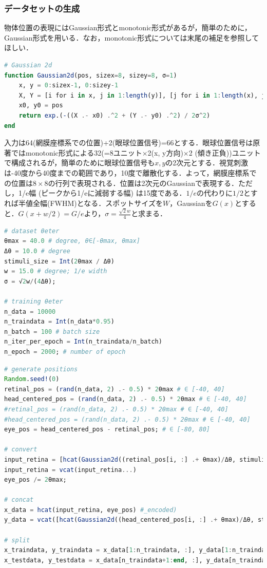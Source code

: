 \subsubsection{データセットの生成}
物体位置の表現にはGaussian形式とmonotonic形式があるが，簡単のために，Gaussian形式を用いる．なお，monotonic形式については末尾の補足を参照してほしい．
\begin{lstlisting}[language=julia]
# Gaussian 2d
function Gaussian2d(pos, sizex=8, sizey=8, σ=1)
    x, y = 0:sizex-1, 0:sizey-1
    X, Y = [i for i in x, j in 1:length(y)], [j for i in 1:length(x), j in y]
    x0, y0 = pos
    return exp.(-((X .- x0) .^2 + (Y .- y0) .^2) / 2σ^2)
end
\end{lstlisting}
入力は64(網膜座標系での位置)+2(眼球位置信号)=66とする．眼球位置信号は原著ではmonotonic形式による32(=8ユニット×2(x, y方向)×2 (傾き正負))ユニットで構成されるが，簡単のために眼球位置信号も$x, y$の2次元とする．視覚刺激は-40度から40度までの範囲であり，10度で離散化する．よって，網膜座標系での位置は$8\times 8$の行列で表現される．位置は2次元のGaussianで表現する．ただし，1/e幅 (ピークから1/eに減弱する幅) は15度である．$1/e$の代わりに$1/2$とすれば半値全幅(FWHM)となる．スポットサイズを$W$，Gaussianを$G(x)$とすると．$G(x+w/2)=G/e$より，$\sigma=\frac{\sqrt{2}w}{4}$と求まる．
\begin{lstlisting}[language=julia]
# dataset θeter
θmax = 40.0 # degree, θ∈[-θmax, θmax]
Δθ = 10.0 # degree
stimuli_size = Int(2θmax / Δθ)
w = 15.0 # degree; 1/e width
σ = √2w/(4Δθ);

# training θeter
n_data = 10000
n_traindata = Int(n_data*0.95)
n_batch = 100 # batch size
n_iter_per_epoch = Int(n_traindata/n_batch)
n_epoch = 2000; # number of epoch
\end{lstlisting}
\begin{lstlisting}[language=julia]
# generate positions
Random.seed!(0)
retinal_pos = (rand(n_data, 2) .- 0.5) * 2θmax # ∈ [-40, 40]
head_centered_pos = (rand(n_data, 2) .- 0.5) * 2θmax # ∈ [-40, 40]
#retinal_pos = (rand(n_data, 2) .- 0.5) * 2θmax # ∈ [-40, 40]
#head_centered_pos = (rand(n_data, 2) .- 0.5) * 2θmax # ∈ [-40, 40]
eye_pos = head_centered_pos - retinal_pos; # ∈ [-80, 80]

# convert
input_retina = [hcat(Gaussian2d((retinal_pos[i, :] .+ θmax)/Δθ, stimuli_size, stimuli_size, σ)...) for i in 1:n_data];
input_retina = vcat(input_retina...)
eye_pos /= 2θmax;

# concat
x_data = hcat(input_retina, eye_pos) #_encoded)
y_data = vcat([hcat(Gaussian2d((head_centered_pos[i, :] .+ θmax)/Δθ, stimuli_size, stimuli_size, σ)...) for i in 1:n_data]...);

# split
x_traindata, y_traindata = x_data[1:n_traindata, :], y_data[1:n_traindata, :]
x_testdata, y_testdata = x_data[n_traindata+1:end, :], y_data[n_traindata+1:end, :];
\end{lstlisting}
